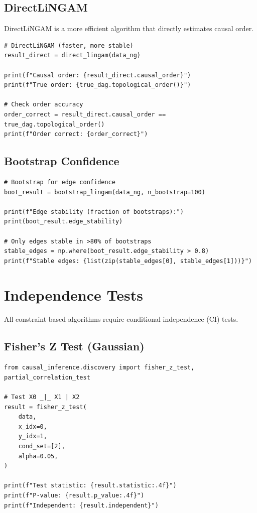 \subsection{DirectLiNGAM}

DirectLiNGAM is a more efficient algorithm that directly estimates causal order.

\begin{verbatim}
# DirectLiNGAM (faster, more stable)
result_direct = direct_lingam(data_ng)

print(f"Causal order: {result_direct.causal_order}")
print(f"True order: {true_dag.topological_order()}")

# Check order accuracy
order_correct = result_direct.causal_order == true_dag.topological_order()
print(f"Order correct: {order_correct}")
\end{verbatim}

\subsection{Bootstrap Confidence}

\begin{verbatim}
# Bootstrap for edge confidence
boot_result = bootstrap_lingam(data_ng, n_bootstrap=100)

print(f"Edge stability (fraction of bootstraps):")
print(boot_result.edge_stability)

# Only edges stable in >80% of bootstraps
stable_edges = np.where(boot_result.edge_stability > 0.8)
print(f"Stable edges: {list(zip(stable_edges[0], stable_edges[1]))}")
\end{verbatim}


\section{Independence Tests}

All constraint-based algorithms require conditional independence (CI) tests.

\subsection{Fisher's Z Test (Gaussian)}

\begin{verbatim}
from causal_inference.discovery import fisher_z_test, partial_correlation_test

# Test X0 _|_ X1 | X2
result = fisher_z_test(
    data,
    x_idx=0,
    y_idx=1,
    cond_set=[2],
    alpha=0.05,
)

print(f"Test statistic: {result.statistic:.4f}")
print(f"P-value: {result.p_value:.4f}")
print(f"Independent: {result.independent}")
\end{verbatim}

